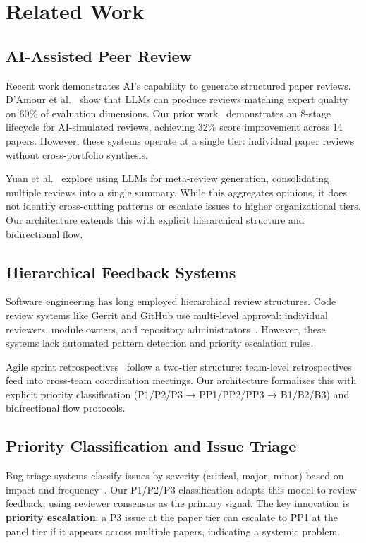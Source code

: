 \section{Related Work}
\label{sec:related}

\subsection{AI-Assisted Peer Review}

Recent work demonstrates AI's capability to generate structured paper reviews. D'Amour et al.~\cite{damour2023simulated} show that LLMs can produce reviews matching expert quality on 60\% of evaluation dimensions. Our prior work~\cite{dellalibera2026review} demonstrates an 8-stage lifecycle for AI-simulated reviews, achieving 32\% score improvement across 14 papers. However, these systems operate at a single tier: individual paper reviews without cross-portfolio synthesis.

Yuan et al.~\cite{yuan2024llm} explore using LLMs for meta-review generation, consolidating multiple reviews into a single summary. While this aggregates opinions, it does not identify cross-cutting patterns or escalate issues to higher organizational tiers. Our architecture extends this with explicit hierarchical structure and bidirectional flow.

\subsection{Hierarchical Feedback Systems}

Software engineering has long employed hierarchical review structures. Code review systems like Gerrit and GitHub use multi-level approval: individual reviewers, module owners, and repository administrators~\cite{rigby2013convergent}. However, these systems lack automated pattern detection and priority escalation rules.

Agile sprint retrospectives~\cite{schwaber2020scrum} follow a two-tier structure: team-level retrospectives feed into cross-team coordination meetings. Our architecture formalizes this with explicit priority classification (P1/P2/P3 → PP1/PP2/PP3 → B1/B2/B3) and bidirectional flow protocols.

\subsection{Priority Classification and Issue Triage}

Bug triage systems classify issues by severity (critical, major, minor) based on impact and frequency~\cite{anvik2006automating}. Our P1/P2/P3 classification adapts this model to review feedback, using reviewer consensus as the primary signal. The key innovation is \textbf{priority escalation}: a P3 issue at the paper tier can escalate to PP1 at the panel tier if it appears across multiple papers, indicating a systemic problem.

